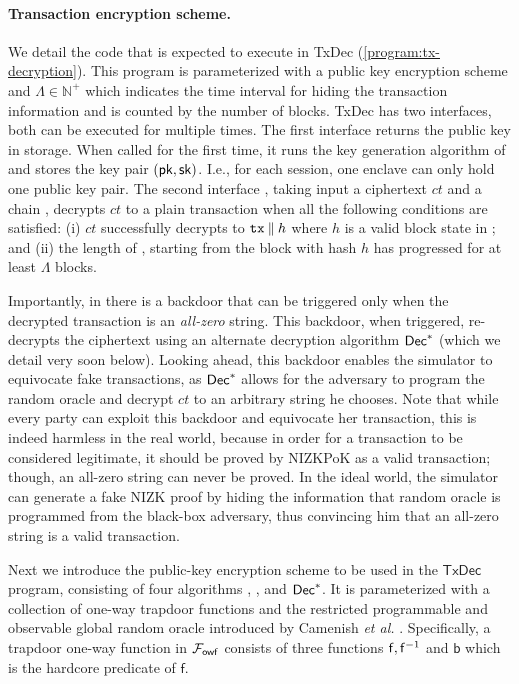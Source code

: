 \paragraph{Transaction encryption scheme.}
%
We detail the code that \funcEnclave is expected to execute in \textsf{TxDec} (\cref{program:tx-decryption}).
%
This program is parameterized with a public key encryption scheme \PKE and $\Lambda \in \mathbb{N}^+$ which indicates the time interval for hiding the transaction information and is counted by the number of blocks.
%
\textsf{TxDec} has two interfaces, both can be executed for multiple times.
%
The first interface \KeyGen returns the public key \pk in storage.
%
When called for the first time, it runs the key generation algorithm of \PKE and stores the key pair $(\mathsf{pk}, \mathsf{sk})$.
%
I.e., for each session, one enclave can only hold one public key pair.
%
The second interface \Dec, taking input a ciphertext $ct$ and a chain \chain, decrypts $ct$ to a plain transaction \tx when all the following conditions are satisfied: (i) $ct$ successfully decrypts to $\mathtt{tx} \mathbin\Vert h$ where $h$ is a valid block state in \chain; and (ii) the length of \chain, starting from the block with hash $h$ has progressed for at least $\Lambda$ blocks.

Importantly, in \Dec there is a backdoor that can be triggered only when the decrypted transaction is an \emph{all-zero} string.
%
This backdoor, when triggered, re-decrypts the ciphertext using an alternate decryption algorithm $\mathsf{Dec}^*$ (which we detail very soon below).
%
Looking ahead, this backdoor enables the simulator to equivocate fake transactions, as $\mathsf{Dec}^*$ allows for the adversary to program the random oracle and decrypt $ct$ to an arbitrary string he chooses.
%
Note that while every party can exploit this backdoor and equivocate her transaction, this is indeed harmless in the real world, because in order for a transaction to be considered legitimate, it should be proved by NIZKPoK as a valid transaction; though, an all-zero string can never be proved.
%
In the ideal world, the simulator can generate a fake NIZK proof by hiding the information that random oracle is programmed from the black-box adversary, thus convincing him that an all-zero string is a valid transaction.



Next we introduce the public-key encryption scheme \PKE to be used in the $\mathsf{TxDec}$ program, consisting of four algorithms \KeyGen, \Enc, \Dec and $\mathsf{Dec}^*$.
%
It is parameterized with a collection of one-way trapdoor functions and the restricted programmable and observable global random oracle \funcGrpoRO introduced by Camenish \textit{et al.} \cite{EC:CDGLN18}.
%
Specifically, a trapdoor one-way function in $\mathcal{F}_{\mathsf{owf}}$ consists of three functions $\mathsf{f}, \mathsf{f}^{-1}$ and $\mathsf{b}$ which is the hardcore predicate of $\mathsf{f}$.


